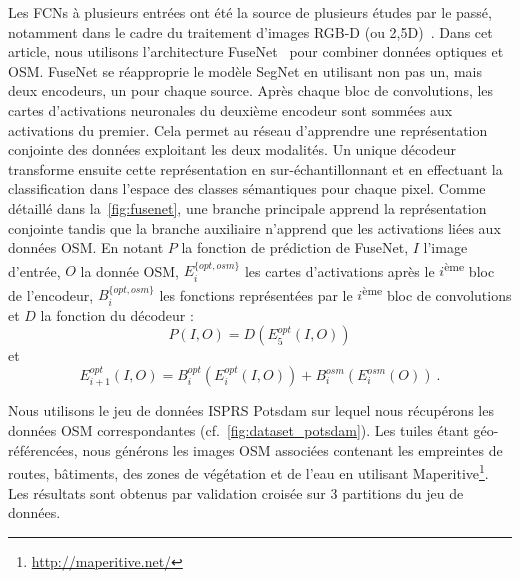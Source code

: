Les \glspl{FCN} à plusieurs entrées ont été la source de plusieurs études par le passé, notamment dans le cadre du traitement d'images \gls{RGB-D} (ou 2,5D)~\cite{eitel_multimodal_2015}. Dans cet article, nous utilisons l'architecture FuseNet~\cite{hazirbas_fusenet_2016} pour combiner données optiques et \gls{OSM}. FuseNet se réapproprie le modèle SegNet en utilisant non pas un, mais deux encodeurs, un pour chaque source. Après chaque bloc de convolutions, les cartes d'activations neuronales du deuxième encodeur sont sommées aux activations du premier. Cela permet au réseau d'apprendre une représentation conjointe des données exploitant les deux modalités. Un unique décodeur transforme ensuite cette représentation en sur-échantillonnant et en effectuant la classification dans l'espace des classes sémantiques pour chaque pixel. Comme détaillé dans la~\cref{fig:fusenet}, une branche principale apprend la représentation conjointe tandis que la branche auxiliaire n'apprend que les activations liées aux données \gls{OSM}. En notant $P$ la fonction de prédiction de FuseNet, $I$ l'image d'entrée, $O$ la donnée \gls{OSM}, $E_i^{\{opt,osm\}}$ les cartes d'activations après le $i$\textsuperscript{ème} bloc de l'encodeur, $B_i^{\{opt,osm\}}$ les fonctions représentées par le $i$\textsuperscript{ème} bloc de convolutions et $D$ la fonction du décodeur :
\begin{equation}
P(I,O) = D(E_5^{opt}(I,O))
\end{equation}
et
\begin{equation}
E_{i+1}^{opt}(I,O) = B_i^{opt}(E_i^{opt}(I, O)) + B_i^{osm}(E_i^{osm}(O))~.
\end{equation}

Nous utilisons le jeu de données \gls{ISPRS} Potsdam sur lequel nous récupérons les données \gls{OSM} correspondantes (cf.~\cref{fig:dataset_potsdam}). Les tuiles étant géo-référencées, nous générons les images \gls{OSM} associées contenant les empreintes de routes, bâtiments, des zones de végétation et de l'eau en utilisant Maperitive\footnote{\url{http://maperitive.net/}}. Les résultats sont obtenus par validation croisée sur 3 partitions du jeu de données.

